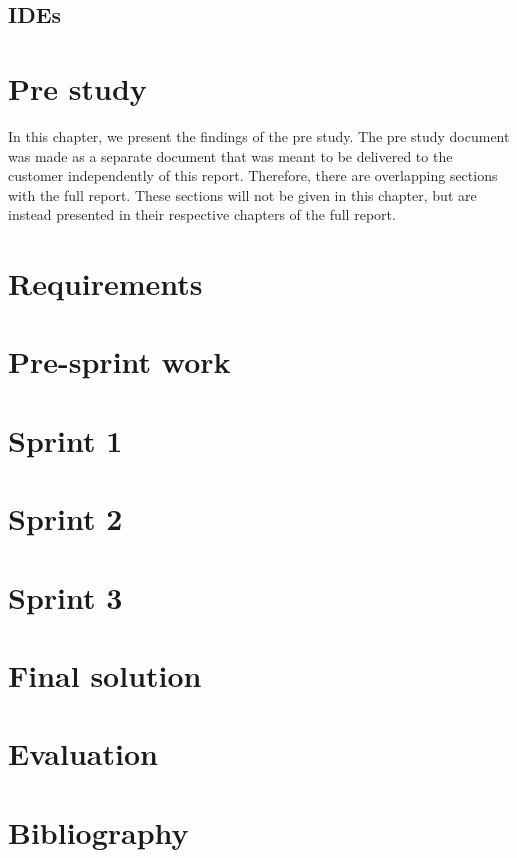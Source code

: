 \documentclass[11pt,a4paper,titlepage,oneside]{report}
\begin{document}
\section{IDEs}

\chapter{Pre study}
In this chapter, we present the findings of the pre study. The pre study document was made as a separate document that was meant to be delivered to the customer independently of this report. Therefore, there are overlapping sections with the full report. These sections will not be given in this chapter, but are instead presented in their respective chapters of the full report. 

\chapter{Requirements}

\chapter {Pre-sprint work}

\chapter{Sprint 1}

\chapter{Sprint 2}

\chapter{Sprint 3}

\chapter{Final solution}

\chapter{Evaluation}



\chapter{Bibliography}
\begin{flushleft}
	
\end{flushleft}

\appendix
\end{document}
